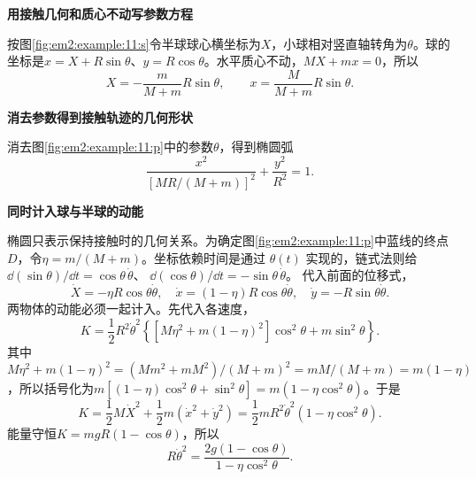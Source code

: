 \begin{solution}\textbf{用接触几何和质心不动写参数方程}\par\nobreak
按图\ref{fig:em2:example:11:s}令半球球心横坐标为$X$，小球相对竖直轴转角为$\theta$。球的坐标是$x=X+R\sin\theta$、$y=R\cos\theta$。水平质心不动，$MX+mx=0$，所以
\[X=-\frac{m}{M+m}R\sin\theta,\qquad x=\frac{M}{M+m}R\sin\theta.\]



\par\medskip{}\noindent\textbf{消去参数得到接触轨迹的几何形状}\par\nobreak
消去图\ref{fig:em2:example:11:p}中的参数$\theta$，得到椭圆弧
\[\boxed{\frac{x^2}{[MR/(M+m)]^2}+\frac{y^2}{R^2}=1}.\]


\par\medskip{}\noindent\textbf{同时计入球与半球的动能}\par\nobreak
椭圆只表示保持接触时的几何关系。为确定图\ref{fig:em2:example:11:p}中蓝线的终点$D$，令$\eta=m/(M+m)$。坐标依赖时间是通过 $\theta(t)$ 实现的，链式法则给
$\dd(\sin\theta)/\dd t=\cos\theta\,\dot\theta$、
$\dd(\cos\theta)/\dd t=-\sin\theta\,\dot\theta$。
代入前面的位移式，
\[
\dot X=-\eta R\cos\theta\dot\theta,\quad
\dot x=(1-\eta)R\cos\theta\dot\theta,\quad
\dot y=-R\sin\theta\dot\theta.
\]
两物体的动能必须一起计入。先代入各速度，
\[
K=\frac12R^2\dot\theta^2
\left\{[M\eta^2+m(1-\eta)^2]\cos^2\theta+m\sin^2\theta\right\}.
\]
其中$M\eta^2+m(1-\eta)^2=(Mm^2+mM^2)/(M+m)^2=mM/(M+m)=m(1-\eta)$，所以括号化为$m[(1-\eta)\cos^2\theta+\sin^2\theta]=m(1-\eta\cos^2\theta)$。于是
\[
K=\frac12M\dot X^2+\frac12m(\dot x^2+\dot y^2)
=\frac12mR^2\dot\theta^2(1-\eta\cos^2\theta).
\]
能量守恒$K=mgR(1-\cos\theta)$，所以
\[
R\dot\theta^2=\frac{2g(1-\cos\theta)}{1-\eta\cos^2\theta}.
\]



\end{solution}
